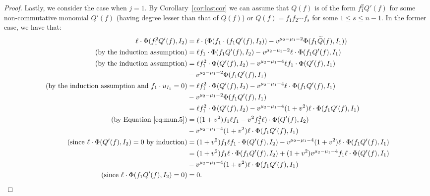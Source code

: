 \documentclass[10pt,a4paper]{amsart}
\begin{document}
\begin{proof}
Lastly, we consider the case when $j=1$. By Corollary~\ref{cor:lastcor} we can assume that $Q(f)$ is of the form $f_1^2Q'(f)$ for some non-commutative monomial $Q'(f)$ (having degree lesser than that of $Q(f)$) or $Q(f)=f_1f_2\cdots f_s$ for some $1\leq s\leq n-1$. In the former case, we have that:
\begin{align*}
\ell\cdot \Phi(f_{1}^2 Q'(f),I_{2}) &= \ell\cdot(\Phi(f_1\cdot(f_1Q'(f),I_2))-v^{\mu_2-\mu_1-2}\Phi(f_1\widetilde{Q}(f),I_1))\\
\text{(by the induction assumption)}&=\ell f_1\cdot\Phi(f_1Q'(f), I_2) - v^{\mu_2-\mu_1-2}\ell\cdot\Phi(f_1Q'(f),I_1)\\
\text{(by the induction assumption)}&= \ell f_1^2\cdot\Phi(Q'(f), I_2) - v^{\mu_2-\mu_1-4}\ell f_1\cdot \Phi(Q'(f),I_1)\\
&- v^{\mu_2-\mu_1-2}\Phi(f_1Q'(f),I_1)\\
\text{(by the induction assumption and $f_1\cdot u_{I_1}=0$)}&= \ell f_1^2\cdot\Phi(Q'(f), I_2) - v^{\mu_2-\mu_1-4}\ell \cdot  \Phi(f_1Q'(f),I_1)\\
&- v^{\mu_2-\mu_1-2}\Phi(f_1Q'(f),I_1)\\
&=\ell f_1^2\cdot\Phi(Q'(f), I_2) - v^{\mu_2-\mu_1-4}(1+v^2)\ell \cdot  \Phi(f_1Q'(f),I_1)\\
\text{(by Equation~\eqref{eq:mun.5})}&=((1+v^2)f_1\ell f_1 - v^2f_1^2\ell)\cdot\Phi(Q'(f), I_2) \\
&- v^{\mu_2-\mu_1-4}(1+v^2)\ell \cdot  \Phi(f_1Q'(f),I_1)\\
\text{(since $\ell\cdot \Phi(Q'(f), I_2)=0$ by induction)}&=(1+v^2)f_1\ell f_1 \cdot\Phi(Q'(f), I_2) - v^{\mu_2-\mu_1-4}(1+v^2)\ell \cdot  \Phi(f_1Q'(f),I_1)\\
&=(1+v^2)f_1\ell \cdot \Phi(f_1Q'(f), I_2) + (1+v^2)v^{\mu_2-\mu_1-4}f_1\ell\cdot \Phi(Q'(f),I_1) \\
&- v^{\mu_2-\mu_1-4}(1+v^2)\ell \cdot  \Phi(f_1Q'(f),I_1)\\
\text{(since $\ell\cdot \Phi(f_1Q'(f), I_2)=0$)}&=0.
\end{align*}


\end{proof}
\end{document}
